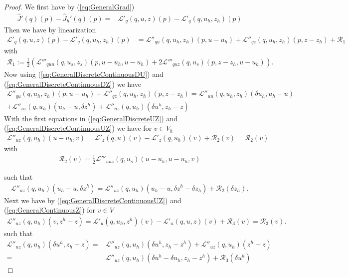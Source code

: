 \begin{proof}
We first have by (\ref{eq:GeneralGrad})
%
\begin{align*}
\hat J'(q)(p) - \hat J_h'(q)(p) =& \mathcal L'_q(q,u,z)(p) - \mathcal L'_q(q,u_h,z_h)(p)
\end{align*}
%
Then we have by linearization
%
\begin{align*}
\mathcal L'_q(q,u,z)(p) - \mathcal L'_q(q,u_h,z_h)(p) &= \mathcal L''_{qu}(q,u_h,z_h)(p,u-u_h) + \mathcal L''_{qz}(q,u_h,z_h)(p,z-z_h) + \mathcal R_1
\end{align*}
%
with
%
\begin{align*}
\mathcal R_1 := \frac12\left(
\mathcal L'''_{quu}(q, u_s, z_s)(p, u-u_h, u-u_h) + 2\mathcal L'''_{quz}(q, u_s)(p, z-z_h, u-u_h)  \right).
\end{align*}
%
Now using (\ref{eq:GeneralDiscreteContinuousDU}) and (\ref{eq:GeneralDiscreteContinuousDZ}) we have
%
\begin{multline*}
\mathcal L''_{qu}(q,u_h,z_h)(p,u-u_h) + \mathcal L''_{qz}(q,u_h,z_h)(p,z-z_h) =
\mathcal L''_{uu}(q,u_h,z_h)(\delta u_h,u_h-u)\\
+\mathcal L''_{uz}(q,u_h)(u_h-u,\delta z^h)
+ \mathcal L''_{uz}(q,u_h)(\delta u^h, z_h-z)
\end{multline*}
%
With the first equations in (\ref{eq:GeneralDiscreteUZ}) and (\ref{eq:GeneralDiscreteContinuousUZ}) we have 
for $v\in V_h$
%
\begin{align*}
\mathcal L''_{uz}(q,u_h)(u-u_h,v) = \mathcal L'_{z}(q,u)(v) -\mathcal L'_{z}(q,u_h)(v)+ \mathcal R_2(v)
= \mathcal R_2(v)
\end{align*}
%
with
%
\begin{align*}
\mathcal R_2(v) = \frac12 \mathcal L'''_{uuz}(q,u_s)(u-u_h,u-u_h,v)
\end{align*}
%

such that
%
\begin{align*}
\mathcal L''_{uz}(q,u_h)(u_h-u,\delta z^h) = \mathcal L''_{uz}(q,u_h)(u_h-u,\delta z^h-\delta z_h) + \mathcal R_2(\delta z_h).
\end{align*}
%
Next we have by (\ref{eq:GeneralDiscreteContinuousUZ}) and (\ref{eq:GeneralContinuousZ}) for $v\in V$
%
\begin{align*}
\mathcal L''_{uz}(q,u_h)(v,z^h-z)= \mathcal L'_{u}(q,u_h,z^h)(v) - \mathcal L'_{u}(q,u,z)(v) +
\mathcal R_3(v) = \mathcal R_3(v) .
\end{align*}
%
such that
%
\begin{align*}
\mathcal L''_{uz}(q,u_h)(\delta u^h, z_h-z) =& \mathcal L''_{uz}(q,u_h)(\delta u^h, z_h-z^h)
+ \mathcal L''_{uz}(q,u_h)(z^h-z)\\
=& \mathcal L''_{uz}(q,u_h)(\delta u^h-\delta u_h, z_h-z^h) + \mathcal R_3(\delta u^h)
\end{align*}
%
\end{proof}
%
%
%
